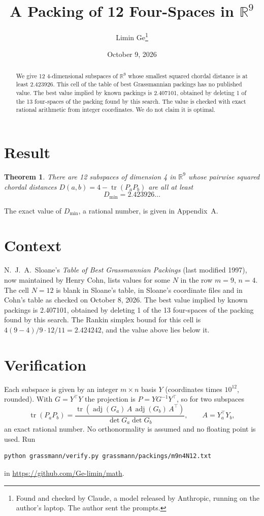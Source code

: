 \documentclass[11pt,a4paper]{article}
\title{A Packing of 12 Four-Spaces in $\mathbb{R}^{9}$}
\author{Limin Ge\thanks{Found and checked by Claude, a model released by Anthropic, running on the author's laptop. The author sent the prompts.}}
\date{October 9, 2026}
\newtheorem*{theorem}{Theorem}
\begin{document}
\maketitle
\begin{abstract}
We give 12 4-dimensional subspaces of $\mathbb{R}^{9}$ whose smallest squared chordal distance is at least 2.423926. This cell of the table of best Grassmannian packings has no published value. The best value implied by known packings is 2.407101, obtained by deleting 1 of the 13 four-spaces of the packing found by this search. The value is checked with exact rational arithmetic from integer coordinates. We do not claim it is optimal.
\end{abstract}

\section{Result}
\begin{theorem}
There are 12 subspaces of dimension 4 in $\mathbb{R}^{9}$ whose pairwise squared chordal distances $D(a,b) = 4 - \operatorname{tr}(P_aP_b)$ are all at least
\[ D_{\min} = 2.423926\ldots \]
\end{theorem}
The exact value of $D_{\min}$, a rational number, is given in Appendix~A.


\section{Context}
N.~J.~A.~Sloane's \emph{Table of Best Grassmannian Packings} (last modified 1997), now maintained by Henry Cohn, lists values for some $N$ in the row $m=9$, $n=4$. The cell $N=12$ is blank in Sloane's table, in Sloane's coordinate files and in Cohn's table as checked on October 8, 2026. The best value implied by known packings is 2.407101, obtained by deleting 1 of the 13 four-spaces of the packing found by this search. The Rankin simplex bound for this cell is $4(9-4)/9\cdot 12/11 = 2.424242$, and the value above lies below it.


\section{Verification}
Each subspace is given by an integer $m\times n$ basis $Y$ (coordinates times $10^{12}$, rounded). With $G=Y^\top Y$ the projection is $P=YG^{-1}Y^\top$, so for two subspaces
\[ \operatorname{tr}(P_aP_b)=\frac{\operatorname{tr}(\operatorname{adj}(G_a)\,A\,\operatorname{adj}(G_b)\,A^\top)}{\det G_a\det G_b},\qquad A=Y_a^\top Y_b, \]
an exact rational number. No orthonormality is assumed and no floating point is used. Run
\begin{verbatim}
python grassmann/verify.py grassmann/packings/m9n4N12.txt
\end{verbatim}
in \url{https://github.com/Ge-limin/math}.
\end{document}
